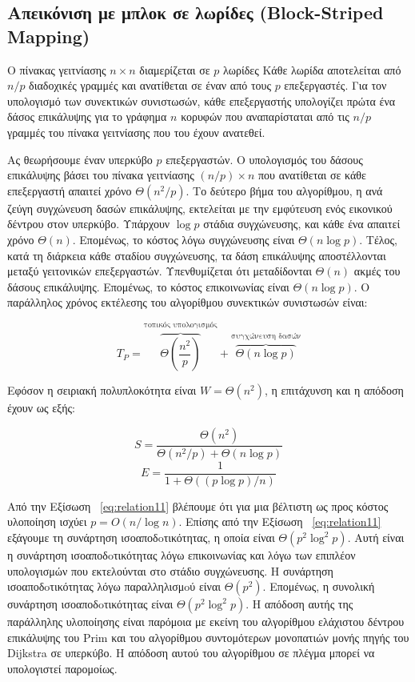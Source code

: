 \documentclass[12pt,a4paper]{article} %
\begin{document}
{{\subsection*{Απεικόνιση με μπλοκ σε λωρίδες (Block-Striped Mapping)}
Ο πίνακας γειτνίασης $n \times n$ διαμερίζεται σε $p$ λωρίδες 
Κάθε λωρίδα αποτελείται από $n/p$ διαδοχικές γραμμές 
και ανατίθεται σε έναν από τους $p$ επεξεργαστές. Για τον υπολογισμό 
των συνεκτικών συνιστωσών, κάθε επεξεργαστής υπολογίζει πρώτα ένα 
δάσος επικάλυψης για το γράφημα $n$ κορυφών που αναπαρίσταται από τις 
$n/p$ γραμμές του πίνακα γειτνίασης που του έχουν ανατεθεί.

Ας θεωρήσουμε έναν υπερκύβο $p$ επεξεργαστών. Ο υπολογισμός του
δάσους επικάλυψης βάσει του πίνακα γειτνίασης $(n/p) \times n$ που
ανατίθεται σε κάθε επεξεργαστή απαιτεί χρόνο $\Theta(n^2/p)$. Το
δεύτερο βήμα του αλγορίθμου, η ανά ζεύγη συγχώνευση δασών
επικάλυψης, εκτελείται με την εμφύτευση ενός εικονικού δέντρου στον
υπερκύβο. Υπάρχουν $\log p$ στάδια συγχώνευσης, και κάθε ένα
απαιτεί χρόνο $\Theta(n)$. Επομένως, το κόστος λόγω συγχώνευσης είναι
$\Theta(n \log p)$. Τέλος, κατά τη διάρκεια κάθε σταδίου συγχώνευσης,
τα δάση επικάλυψης αποστέλλονται μεταξύ γειτονικών επεξεργαστών.
Υπενθυμίζεται ότι μεταδίδονται $\Theta(n)$ ακμές του δάσους
επικάλυψης. Επομένως, το κόστος επικοινωνίας είναι $\Theta(n \log p)$.
Ο παράλληλος χρόνος εκτέλεσης του αλγορίθμου συνεκτικών συνιστωσών
είναι:

\[
T_P = \overbrace{\Theta\left(\frac{n^2}{p}\right)}^{\text{τοπικός υπολογισμός}}
    + \overbrace{\Theta(n \log p)}^{\text{συγχώνευση δασών}}
\]
\par\vspace{0.3cm}
\noindent
Εφόσον η σειριακή πολυπλοκότητα είναι $W = \Theta(n^2)$, η επιτάχυνση 
και η απόδοση έχουν ως εξής:

\[
S = \frac{\Theta(n^2)}{\Theta(n^2/p) + \Theta(n \log p)} 
\]
\begin{equation}
E = \frac{1}{1 + \Theta((p \log p)/n)}
\label{eq:relation11}
\end{equation}
\par\vspace{0.3cm}
\noindent
Από την Εξίσωση ~\ref{eq:relation11} βλέπουμε ότι για μια βέλτιστη ως προς κόστος
υλοποίηση ισχύει $p = O(n / \log n)$. Επίσης από την Εξίσωση ~\ref{eq:relation11}
εξάγουμε τη συνάρτηση ισοαποδoτικότητας, η οποία είναι
$\Theta(p^2 \log^2 p)$. Αυτή είναι η συνάρτηση ισοαποδoτικότητας
λόγω επικοινωνίας και λόγω των επιπλέον υπολογισμών που εκτελούνται
στο στάδιο συγχώνευσης. Η συνάρτηση ισοαποδoτικότητας λόγω
παραλληλισμoύ είναι $\Theta(p^2)$. Επομένως, η συνολική συνάρτηση
ισοαποδoτικότητας είναι $\Theta(p^2 \log^2 p)$. Η απόδοση αυτής
της παράλληλης υλοποίησης είναι παρόμοια με εκείνη του αλγορίθμου
ελάχιστου δέντρου επικάλυψης του Prim και του αλγορίθμου
συντομότερων μονοπατιών μονής πηγής του Dijkstra σε υπερκύβο.
Η απόδοση αυτού του αλγορίθμου σε πλέγμα μπορεί να υπολογιστεί
παρομοίως.

}}
\end{document}
